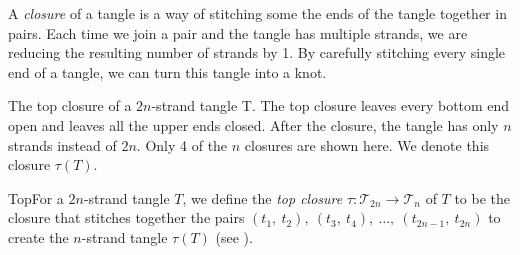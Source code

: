 \begin{paper}
A \textit{closure} of a tangle is a way of stitching some the ends of the tangle
together in pairs.
Each time we join a pair and the tangle has multiple strands, we are reducing
the resulting number of strands by 1.
By carefully stitching every single end of a tangle, we can turn this tangle
into a knot.

{The top closure of a $2n$-strand tangle T.
The top closure leaves every bottom end open and leaves all the upper ends
closed.
After the closure, the tangle has only $n$ strands instead of $2n$.
Only 4 of the $n$ closures are shown here.
We denote this closure $\tau(T)$.}

\begin{paperdef}{Top}{For a $2n$-strand tangle $T$, we define the
\textit{top closure} $\tau:\mathcal{T}_{2n}\to\mathcal{T}_n$ of $T$ to be the
closure that stitches together the pairs
$(t_1,~t_2),~(t_3,~t_4),~\dots,~(t_{2n-1},~t_{2n})$ to create the $n$-strand
tangle $\tau(T)$ (see \figTop).}\end{paperdef}


\end{paper}
